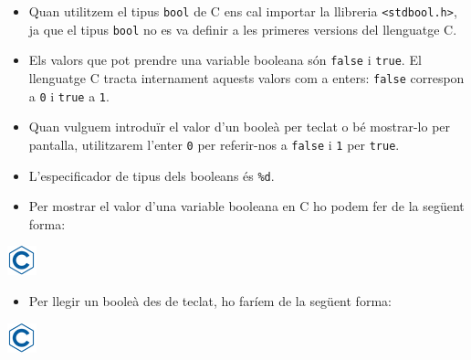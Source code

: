 \documentclass[]{book}
\newenvironment{Shaded}{\begin{snugshade}}{\end{snugshade}}
\newcommand{\DataTypeTok}[1]{\textcolor[rgb]{0.13,0.29,0.53}{#1}}
\newcommand{\SpecialCharTok}[1]{\textcolor[rgb]{0.00,0.00,0.00}{#1}}
\newcommand{\StringTok}[1]{\textcolor[rgb]{0.31,0.60,0.02}{#1}}
\newcommand{\NormalTok}[1]{#1}
\providecommand{\tightlist}{%
  \setlength{\itemsep}{0pt}\setlength{\parskip}{0pt}}
\begin{document}
\begin{itemize}
\item
  Quan utilitzem el tipus \texttt{bool} de C ens cal importar la
  llibreria \texttt{\textless{}stdbool.h\textgreater{}}, ja que el tipus
  \texttt{bool} no es va definir a les primeres versions del llenguatge
  C.
\item
  Els valors que pot prendre una variable booleana són \texttt{false} i
  \texttt{true}. El llenguatge C tracta internament aquests valors com a
  enters: \texttt{false} correspon a \texttt{0} i \texttt{true} a
  \texttt{1}.
\item
  Quan vulguem introduïr el valor d'un booleà per teclat o bé mostrar-lo
  per pantalla, utilitzarem l'enter \texttt{0} per referir-nos a
  \texttt{false} i \texttt{1} per \texttt{true}.
\item
  L'especificador de tipus dels booleans és \texttt{\%d}.
\item
  Per mostrar el valor d'una variable booleana en C ho podem fer de la
  següent forma:
\end{itemize}

\includegraphics{./img/c.png}

\begin{Shaded}
\end{Shaded}

\begin{itemize}
\tightlist
\item
  Per llegir un booleà des de teclat, ho faríem de la següent forma:
\end{itemize}

\includegraphics{./img/c.png}

\begin{Shaded}
\end{Shaded}
\end{document}
